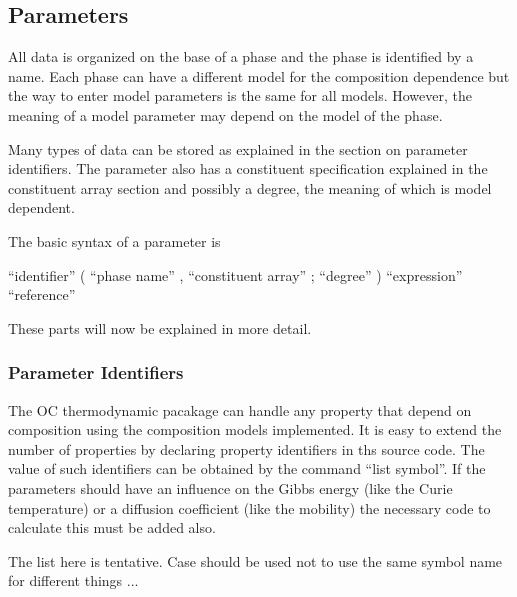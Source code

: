 \documentclass[12pt]{article}
\begin{document}
\subsection{Parameters}

All data is organized on the base of a phase and the phase is
identified by a name.  Each phase can have a different model for the
composition dependence but the way to enter model parameters is the
same for all models.  However, the meaning of a model parameter may
depend on the model of the phase.

Many types of data can be stored as explained in the section on
parameter identifiers.  The parameter also has a constituent
specification explained in the constituent array section and possibly
a degree, the meaning of which is model dependent.

The basic syntax of a parameter is

``identifier'' ( ``phase name'' , ``constituent array'' ; ``degree'' ) ``expression'' ``reference''

These parts will now be explained in more detail.

\subsubsection{Parameter Identifiers}

The OC thermodynamic pacakage can handle any property that depend on
composition using the composition models implemented.  It is easy to
extend the number of properties by declaring property identifiers in
ths source code.  The value of such identifiers can be obtained by the
command ``list symbol''.  If the parameters should have an influence
on the Gibbs energy (like the Curie temperature) or a diffusion
coefficient (like the mobility) the necessary code to calculate this
must be added also.

The list here is tentative.  Case should be used not to use the
same symbol name for different things ...
\end{document}

